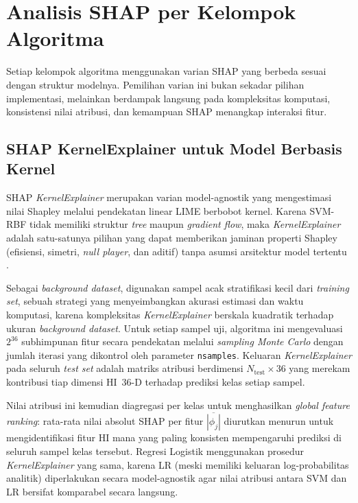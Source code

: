\section{Analisis SHAP per Kelompok Algoritma}
\label{sec:bab4_shap}

Setiap kelompok algoritma menggunakan varian SHAP yang berbeda sesuai dengan
struktur modelnya.
Pemilihan varian ini bukan sekadar pilihan implementasi, melainkan
berdampak langsung pada kompleksitas komputasi, konsistensi nilai atribusi,
dan kemampuan SHAP menangkap interaksi fitur.

\subsection{SHAP KernelExplainer untuk Model Berbasis Kernel}
\label{subsec:bab4_shap_kernel}

SHAP \emph{KernelExplainer} merupakan varian model-agnostik yang mengestimasi
nilai Shapley melalui pendekatan linear LIME berbobot kernel.
Karena SVM-RBF tidak memiliki struktur \emph{tree} maupun \emph{gradient flow}, 
maka \emph{KernelExplainer} adalah satu-satunya pilihan yang dapat
memberikan jaminan properti Shapley (efisiensi, simetri, \emph{null player},
dan aditif) tanpa asumsi arsitektur model tertentu .

Sebagai \emph{background dataset}, digunakan sampel acak stratifikasi 
kecil dari \emph{training set}, sebuah strategi yang menyeimbangkan
akurasi estimasi dan waktu komputasi, karena kompleksitas \emph{KernelExplainer}
berskala kuadratik terhadap ukuran \emph{background dataset}.
Untuk setiap sampel uji, algoritma ini mengevaluasi $2^{36}$ subhimpunan fitur
secara pendekatan melalui \emph{sampling Monte Carlo} dengan jumlah iterasi
yang dikontrol oleh parameter \texttt{nsamples}.
Keluaran \emph{KernelExplainer} pada seluruh \emph{test set} adalah matriks
atribusi berdimensi $N_\text{test} \times 36$ yang merekam kontribusi tiap
dimensi HI~36-D terhadap prediksi kelas setiap sampel.

Nilai atribusi ini kemudian diagregasi per kelas untuk menghasilkan
\emph{global feature ranking}: rata-rata nilai absolut SHAP per fitur
$\overline{|\phi_j|}$ diurutkan menurun untuk mengidentifikasi fitur HI mana
yang paling konsisten mempengaruhi prediksi di seluruh sampel kelas tersebut.
Regresi Logistik menggunakan prosedur \emph{KernelExplainer} yang sama,
karena LR (meski memiliki keluaran log-probabilitas analitik) diperlakukan
secara model-agnostik agar nilai atribusi antara SVM dan LR bersifat
komparabel secara langsung.

